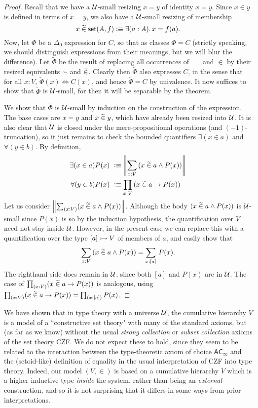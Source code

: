 \begin{proof}
Recall that we have a $\mathcal{U}$-small resizing $x = y$ of identity $x = y$. Since $x\in y$ is defined in terms of $x=y$, we also have a $\mathcal{U}$-small resizing of membership
%
\begin{equation*}
  x\bin\vset(A,f) \defeq \exis{a:A} x = f(a).
\end{equation*}
%
Now, let $\Phi$ be a $\Delta_0$ expression for $C$, so that as classes $\Phi = C$ (strictly speaking, we should distinguish expressions from their meanings, but we will blur the difference). Let $\widetilde{\Phi}$ be the result of replacing all occurrences of $=$ and $\in$ by their resized equivalents $\sim$ and $\mathrel{\widetilde{\in}}$.  Clearly then $\widetilde{\Phi}$ also expresses $C$, in the sense that for all $x:V$, $\widetilde{\Phi}(x) \Leftrightarrow C(x)$, and hence $\widetilde{\Phi}=C$ by univalence.  It now suffices to show that $\widetilde{\Phi}$ is $\mathcal{U}$-small, for then it will be separable by the theorem.  

We show that  $\widetilde{\Phi}$ is $\mathcal{U}$-small by induction on the construction of the expression.  The base cases are $x = y$ and $x\mathrel{\widetilde{\in}} y$, which have already been resized into $\mathcal{U}$.  It is also clear that $\mathcal{U}$ is closed under the mere-propositional operations (and $(-1)$-truncation), so it just remains to check the bounded quantifiers $\exists(x\in a)$ and $\forall(y\in b)$.  By definition,  
\begin{align*}
\exists(x\in a) P(x)\ &\defeq \brck {\sm{x:V}(x\bin a \land P(x))}\\
\forall(y\in b) P(x)\ &\defeq  \prd{x:V}(x\bin a \to P(x))
\end{align*} 
Let us consider $\brck {\sm{x:V}(x\bin a \land P(x))}$.  Although the body $(x\mathrel{\widetilde{\in}} a \land P(x))$ is $\mathcal{U}$-small since $P(x)$ is so by the induction hypothesis, the quantification over $V$ need not stay inside $\mathcal{U}$.  However, in the present case we can replace this with a quantification over the type $[a]\rightarrowtail V$ of members of $a$, and easily show that
\begin{equation*}
  \sm{x:V}(x\bin a \land P(x)) = \sm{x:[a]} P(x).
\end{equation*}
The righthand side does remain in $\mathcal{U}$, since both $[a]$ and $P(x)$ are in $\mathcal{U}$.  The case of $\prd{x:V}(x\bin a \to P(x))$ is analogous, using $\prd{x:V}(x\bin a \to P(x)) = \prd{x:[a]}P(x)$.
\end{proof}

We have shown that in type theory with a universe $\mathcal{U}$, the cumulative hierarchy $V$ is a model of a ``constructive set theory" with many of the standard axioms, but (as far as we know) without the usual \emph{strong collection} or \emph{subset collection} axioms of the set theory CZF.  We do not expect these to hold, since they seem to be related to the interaction between the type-theoretic axiom of choice $\mathsf{AC}_\infty$ and the (setoid-like) definition of equality in the usual interpretation of CZF into type theory.  Indeed, our model $(V,\in)$ is based on a cumulative hierarchy $V$ which is a higher inductive type \emph{inside} the system, rather than being an \emph{external} construction, and so it is not surprising that it differs in some ways from prior interpretations.


